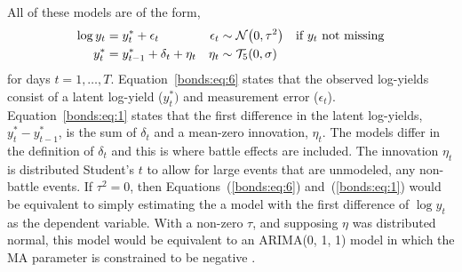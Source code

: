 All of these models are of the form,
\begin{align}
  \label{bonds:eq:6}
  \log y_{t} &= y^{*}_{t} + \epsilon_{t} & \epsilon_{t} &\sim \mathcal{N}\mathopen{}\left(0, \tau^{2}\right)\mathclose{} & \text{if $y_t$ not missing} \\
  \label{bonds:eq:1}
  y^{*}_{t} &= y^{*}_{t - 1} + \delta_{t} + \eta_{t} & \eta_{t} &\sim \mathcal{T}_{5}\mathopen{}\left(0, \sigma\right)\mathclose{}
\end{align}
for days $t = 1, \dots, T$.
Equation~\eqref{bonds:eq:6} states that the observed log-yields consist of a latent log-yield ($y^{*}_{t})$ and measurement error ($\epsilon_{t}$).
Equation~\eqref{bonds:eq:1} states that the first difference in the latent log-yields, $y^{*}_{t} - y^{*}_{t-1}$, is the sum of $\delta_{t}$ and a mean-zero innovation, $\eta_{t}$.
The models differ in the definition of $\delta_{t}$ and this is where battle effects are included.
The innovation $\eta_{t}$ is distributed Student's $t$ to allow for large events that are unmodeled, \ie{}any non-battle events.
If $\tau^{2} = 0$, then Equations~(\ref{bonds:eq:6}) and~(\ref{bonds:eq:1}) would be equivalent to simply estimating the a model with the first difference of $\log y_{t}$ as the dependent variable.
With a non-zero $\tau$, and supposing $\eta$ was distributed normal, this model would be equivalent to an ARIMA(0, 1, 1) model in which the MA parameter is constrained to be negative \parencite[91]{PetrisPetroneEtAl2009}.

